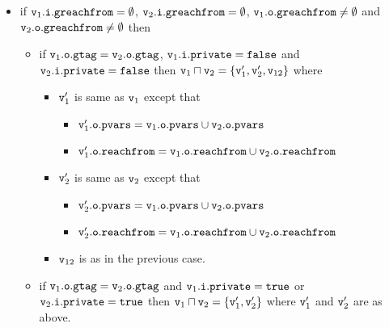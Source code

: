 \begin{itemize}
 \item if $\mathtt{v}_1.\mathtt{i}.\mathtt{greachfrom} = \emptyset$, $\mathtt{v}_2.\mathtt{i}.\mathtt{greachfrom} = \emptyset$, $\mathtt{v}_1.\mathtt{o}.\mathtt{greachfrom} \neq \emptyset$ and $\mathtt{v}_2.\mathtt{o}.\mathtt{greachfrom} \neq \emptyset$ then 
  \begin{itemize}
  \item if $\mathtt{v}_1.\mathtt{o}.\mathtt{gtag} = \mathtt{v}_2.\mathtt{o}.\mathtt{gtag}$, $\mathtt{v}_1.\mathtt{i}.\mathtt{private} = {\tt false}$ and $\mathtt{v}_2.\mathtt{i}.\mathtt{private} = {\tt false}$ then $\mathtt{v}_1 \sqcap \mathtt{v}_2 = \left\{\mathtt{v}_1', \mathtt{v}_2', \mathtt{v}_{12}\right\}$ where
      \begin{itemize}
      \item
        $\mathtt{v}_1'$ is same as $\mathtt{v}_1$ except that 
    \begin{itemize}
  \item  $\mathtt{v}_1'.\mathtt{o}.\mathtt{pvars} = \mathtt{v}_1.\mathtt{o}.\mathtt{pvars} \cup \mathtt{v}_2.\mathtt{o}.\mathtt{pvars}$
  \item $\mathtt{v}_1'.\mathtt{o}.\mathtt{reachfrom} = \mathtt{v}_{1}.\mathtt{o}.\mathtt{reachfrom} \cup \mathtt{v}_{2}.\mathtt{o}.\mathtt{reachfrom}$
    \end{itemize}
  \item
    $\mathtt{v}_2'$ is same as $\mathtt{v}_2$ except that 
    \begin{itemize}
  \item  $\mathtt{v}_2'.\mathtt{o}.\mathtt{pvars} = \mathtt{v}_1.\mathtt{o}.\mathtt{pvars} \cup \mathtt{v}_2.\mathtt{o}.\mathtt{pvars}$
  \item $\mathtt{v}_2'.\mathtt{o}.\mathtt{reachfrom} = \mathtt{v}_{1}.\mathtt{o}.\mathtt{reachfrom} \cup \mathtt{v}_{2}.\mathtt{o}.\mathtt{reachfrom}$
    \end{itemize}
  \item
    $\mathtt{v}_{12}$ is as in the previous case.
      \end{itemize}
    \item if $\mathtt{v}_1.\mathtt{o}.\mathtt{gtag} = \mathtt{v}_2.\mathtt{o}.\mathtt{gtag}$ and $\mathtt{v}_1.\mathtt{i}.\mathtt{private} = {\tt true}$ or $\mathtt{v}_2.\mathtt{i}.\mathtt{private} = {\tt true}$ then $\mathtt{v}_1 \sqcap \mathtt{v}_2 = \left\{\mathtt{v}_1', \mathtt{v}_2'\right\}$ where
$\mathtt{v}_1'$ and $\mathtt{v}_2'$ are as above.
 \end{itemize}
 

\end{itemize}
